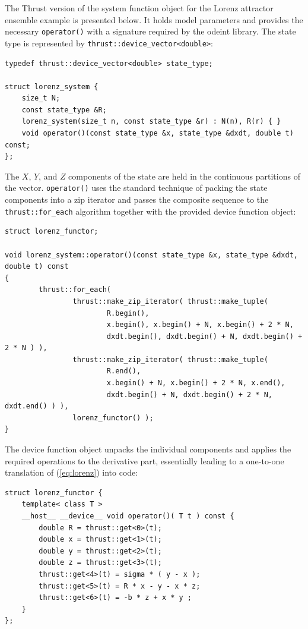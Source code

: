 \documentclass[final]{siamltex}
\newcommand{\code}[1]{\lstinline$#1$}
\newcommand{\eqref}[1]{(\ref{#1})}
\begin{document}
The Thrust version of the system function object for the Lorenz attractor ensemble
example is presented below. It holds model parameters and provides the necessary
\code{operator()} with a signature required by the odeint library. The state
type is represented by \code{thrust::device_vector<double>}:
\begin{lstlisting}
typedef thrust::device_vector<double> state_type;

struct lorenz_system {
    size_t N;
    const state_type &R;
    lorenz_system(size_t n, const state_type &r) : N(n), R(r) { }
    void operator()(const state_type &x, state_type &dxdt, double t) const;
};
\end{lstlisting}
The $X$, $Y$, and $Z$ components of the state are held in the continuous
partitions of the vector.  \code{operator()} uses the standard technique of
packing the state components into a zip iterator and passes the composite
sequence to the \code{thrust::for_each} algorithm together with the provided
device function object:
\begin{lstlisting}[firstnumber=12]
struct lorenz_functor;

void lorenz_system::operator()(const state_type &x, state_type &dxdt, double t) const
{
        thrust::for_each(
                thrust::make_zip_iterator( thrust::make_tuple(
                        R.begin(),
                        x.begin(), x.begin() + N, x.begin() + 2 * N,
                        dxdt.begin(), dxdt.begin() + N, dxdt.begin() + 2 * N ) ),
                thrust::make_zip_iterator( thrust::make_tuple(
                        R.end(),
                        x.begin() + N, x.begin() + 2 * N, x.end(),
                        dxdt.begin() + N, dxdt.begin() + 2 * N, dxdt.end() ) ),
                lorenz_functor() );
}
\end{lstlisting}
The device function object unpacks the individual components and applies the required
operations to the derivative part, essentially leading to a one-to-one
translation of \eqref{eq:lorenz} into code:
\begin{lstlisting}[firstnumber=last]
struct lorenz_functor {
    template< class T >
    __host__ __device__ void operator()( T t ) const {
        double R = thrust::get<0>(t);
        double x = thrust::get<1>(t);
        double y = thrust::get<2>(t);
        double z = thrust::get<3>(t);
        thrust::get<4>(t) = sigma * ( y - x );
        thrust::get<5>(t) = R * x - y - x * z;
        thrust::get<6>(t) = -b * z + x * y ;
    }
};
\end{lstlisting}
\end{document}
